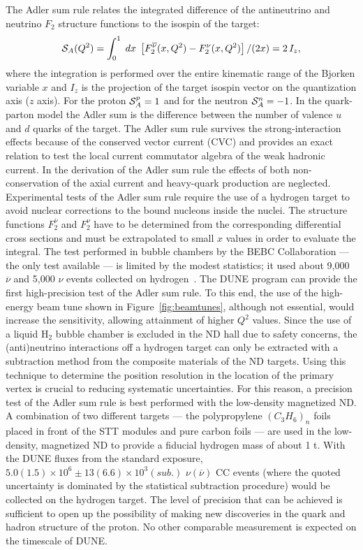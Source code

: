 The Adler sum rule relates the integrated difference of the
antineutrino and neutrino $F_2$ structure functions to the isospin of the target:
%
\begin{equation}
\label{ASR}
{\cal S}_A (Q^2) =\int_0^1 \; dx \; \left[ F_2^{\overline\nu} (x,Q^2) - F_2^{\nu}(x,Q^2) \right]/(2x)
= 2\,I_z,
\end{equation}
%
where the integration is performed over the entire kinematic range of the
Bjorken variable $x$ and $I_z$ is the projection of
the target isospin vector on the quantization axis ($z$ axis).
For the proton ${\cal S}_A^{p}=1$ and for the neutron ${\cal S}_A^{n}=-1$.
In the quark-parton model the Adler sum is the difference between the
number of valence $u$ and $d$ quarks of the target. The Adler sum rule
survives the strong-interaction effects because of the conserved vector 
current (CVC) and provides an
exact relation to test the local current commutator algebra of the weak
hadronic current. %
In the derivation of the Adler sum rule the effects of both
non-conservation of the axial current and heavy-quark production are
neglected. 
Experimental tests of the Adler sum rule require the use of a hydrogen target
to avoid nuclear corrections to the bound nucleons inside the nuclei.
The structure functions $F_2^{\overline{\nu}}$ and $F_2^\nu$ have to be determined
from the corresponding differential cross sections and must be extrapolated
to small $x$ values in order to evaluate the integral. %
The test performed in bubble chambers by the BEBC
Collaboration --- the only test available ---  is limited by the modest statistics;
it used about 9,000 $\overline{\nu}$ and 5,000 $\nu$ events
collected on hydrogen~\cite{Allasia:1985hw}.
The DUNE program can provide the first high-precision test of the
Adler sum rule.  To this end, the use of the high-energy beam tune
shown in Figure~\ref{fig:beamtunes}, although not essential, would
increase the sensitivity, allowing attainment of higher $Q^2$
values. Since the use of a liquid H$_2$ bubble chamber is excluded in
the ND hall due to safety concerns, the (anti)neutrino interactions
off a hydrogen target can only be extracted with a subtraction method
from the composite materials of the ND targets.  Using this technique
to determine the position resolution in the location of the primary
vertex is crucial to reducing systematic uncertainties.  For this
reason, a precision test of the Adler sum rule is best performed with
the low-density magnetized ND.
A combination of two different targets --- the polypropylene
$(C_3H_6)_n$ foils placed in front of the STT modules and pure carbon
foils --- are used in the low-density, magnetized 
ND to provide a
fiducial hydrogen mass of about 1 t.  With the DUNE fluxes from
the standard exposure, $5.0(1.5) \times 10^6 \pm 13(6.6)\times 10^3
(sub.)$ $\nu(\overline{\nu})$ CC events (where the quoted uncertainty is dominated by the
statistical subtraction procedure) %
would be collected on the hydrogen
target.  The level of precision that can be achieved is sufficient to
open up the possibility of making new discoveries in the quark and
hadron structure of the proton. No other comparable measurement is
expected on the timescale of DUNE.

